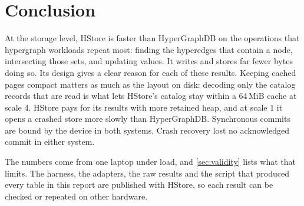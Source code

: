 \section{Conclusion}

At the storage level, HStore is faster than HyperGraphDB on the operations that hypergraph workloads repeat most: finding the hyperedges that contain a node, intersecting those sets, and updating values. It writes and stores far fewer bytes doing so. Its design gives a clear reason for each of these results. Keeping cached pages compact matters as much as the layout on disk: decoding only the catalog records that are read is what lets HStore's catalog stay within a 64\,MiB cache at scale 4. HStore pays for its results with more retained heap, and at scale 1 it opens a crashed store more slowly than HyperGraphDB. Synchronous commits are bound by the device in both systems. Crash recovery lost no acknowledged commit in either system.

The numbers come from one laptop under load, and \cref{sec:validity} lists what that limits. The harness, the adapters, the raw results and the script that produced every table in this report are published with HStore, so each result can be checked or repeated on other hardware.
